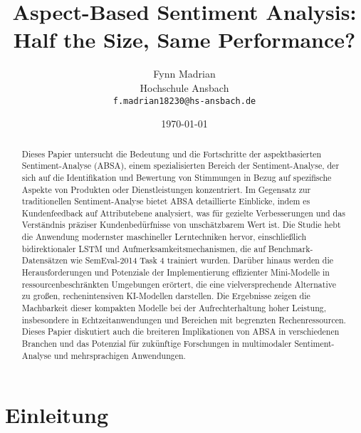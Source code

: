 \documentclass[12pt]{article}
\title{Aspect-Based Sentiment Analysis: Half the Size, Same Performance?}
\author{Fynn Madrian \\ Hochschule Ansbach \\ \texttt{f.madrian18230@hs-ansbach.de}}
\date{\today}
\begin{document}
\maketitle

\begin{abstract}
Dieses Papier untersucht die Bedeutung und die Fortschritte der aspektbasierten Sentiment-Analyse (ABSA), einem spezialisierten Bereich der 
Sentiment-Analyse, der sich auf die Identifikation und Bewertung von Stimmungen in Bezug auf spezifische Aspekte von Produkten oder Dienstleistungen 
konzentriert. Im Gegensatz zur traditionellen Sentiment-Analyse bietet ABSA detaillierte Einblicke, indem es Kundenfeedback auf Attributebene 
analysiert, was für gezielte Verbesserungen und das Verständnis präziser Kundenbedürfnisse von unschätzbarem Wert ist. Die Studie hebt die 
Anwendung modernster maschineller Lerntechniken hervor, einschließlich bidirektionaler LSTM und Aufmerksamkeitsmechanismen, die auf 
Benchmark-Datensätzen wie SemEval-2014 Task 4 trainiert wurden. Darüber hinaus werden die Herausforderungen und Potenziale der Implementierung 
effizienter Mini-Modelle in ressourcenbeschränkten Umgebungen erörtert, die eine vielversprechende Alternative zu großen, rechenintensiven 
KI-Modellen darstellen. Die Ergebnisse zeigen die Machbarkeit dieser kompakten Modelle bei der Aufrechterhaltung hoher Leistung, insbesondere 
in Echtzeitanwendungen und Bereichen mit begrenzten Rechenressourcen. Dieses Papier diskutiert auch die breiteren Implikationen 
von ABSA in verschiedenen Branchen und das Potenzial für zukünftige Forschungen in multimodaler Sentiment-Analyse und mehrsprachigen 
Anwendungen.\end{abstract}

\section{Einleitung}
\end{document}
